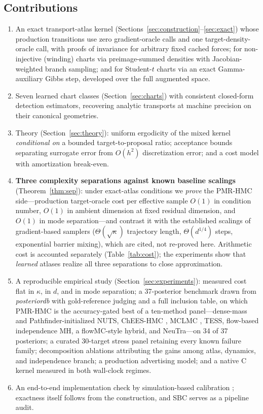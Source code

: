 \documentclass[11pt]{article}
\theoremstyle{remark}
\begin{document}
\subsection{Contributions}
\begin{enumerate}
\item An exact transport-atlas kernel
  (Sections~\ref{sec:construction}--\ref{sec:exact}) whose production
  transitions use zero gradient-oracle calls and one target-density-oracle
  call, with proofs of invariance for arbitrary fixed cached forces; for
  non-injective (winding) charts via preimage-summed densities with
  Jacobian-weighted branch sampling; and for Student-$t$ charts via an
  exact Gamma-auxiliary Gibbs step, developed over the full augmented
  space.
\item Seven learned chart classes (Section~\ref{sec:charts}) with
  consistent closed-form detection estimators, recovering analytic
  transports at machine precision on their canonical geometries.
\item Theory (Section~\ref{sec:theory}): uniform ergodicity of the mixed
  kernel \emph{conditional on} a bounded target-to-proposal ratio;
  acceptance bounds separating surrogate error from $O(h^2)$
  discretization error; and a cost model with amortization break-even.
\item \textbf{Three complexity separations against known baseline
  scalings} (Theorem~\ref{thm:sep}): under exact-atlas conditions we
  \emph{prove} the PMR-HMC side---production target-oracle cost per
  effective sample $O(1)$ in condition number, $O(1)$ in ambient
  dimension at fixed residual dimension, and $O(1)$ in mode
  separation---and contrast it with the established scalings of
  gradient-based samplers ($\Theta(\sqrt\kappa)$ trajectory length,
  $\Theta(d^{1/4})$ steps, exponential barrier mixing), which are
  cited, not re-proved here. Arithmetic cost is accounted separately
  (Table~\ref{tab:cost}); the experiments show that \emph{learned}
  atlases realize all three separations to close approximation.
\item A reproducible empirical study (Section~\ref{sec:experiments}):
  measured cost flat in $\kappa$, in $d$, and in mode separation; a
  37-posterior benchmark drawn from \emph{posteriordb}
  \citep{magnusson2024} with gold-reference judging and a full inclusion
  table, on which PMR-HMC is the accuracy-gated best of a ten-method
  panel---dense-mass and Pathfinder-initialized NUTS, ChEES-HMC
  \citep{hoffman2021}, MCLMC \citep{robnik2023}, TESS, flow-based
  independence MH, a flowMC-style hybrid, and NeuTra---on 34 of 37
  posteriors; a curated 30-target stress panel retaining every known
  failure family; decomposition ablations attributing the gains among
  atlas, dynamics, and independence branch; a production advertising
  model; and a native C kernel measured in both wall-clock regimes.
\item An end-to-end implementation check by simulation-based calibration
  \citep{talts2018}; exactness itself follows from the construction, and
  SBC serves as a pipeline audit.
\end{enumerate}
\end{document}
